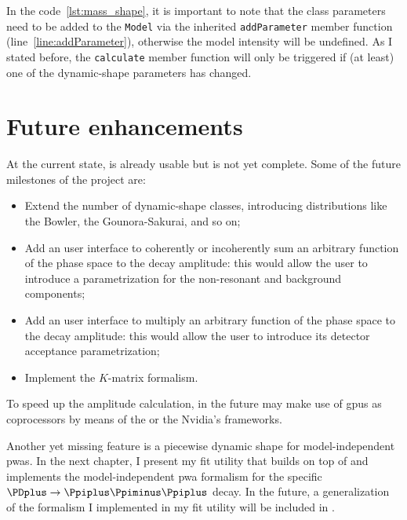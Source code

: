     
    In the code~\ref{lst:mass_shape}, it is important to note that the class parameters need to be added to the \lstinline!Model! via the inherited \lstinline!addParameter! member function (line~\ref{line:addParameter}), otherwise the model intensity will be undefined.
    As I stated before, the \lstinline!calculate! member function will only be triggered if (at least) one of the dynamic-shape parameters has changed.


    \section{Future enhancements}

    At the current state,  is already usable but is not yet complete.
    Some of the future milestones of the project are:
    \begin{itemize}
        \item
            Extend the number of dynamic-shape classes, introducing distributions like the Bowler, the Gounora-Sakurai, and so on;

        \item
            Add an user interface to coherently or incoherently sum an arbitrary function of the phase space to the decay amplitude: this would allow the user to introduce a parametrization for the non-resonant and background components;

        \item
            Add an user interface to multiply an arbitrary function of the phase space to the decay amplitude: this would allow the user to introduce its detector acceptance parametrization;

        \item
            Implement the $K$-matrix formalism.

    \end{itemize}

    To speed up the amplitude calculation, in the future  may make use of \acsp{gpu} as coprocessors by means of the  or the Nvidia's  frameworks.


    Another yet missing feature is a piecewise dynamic shape for model-independent \acp{pwa}.
    In the next chapter, I present my fit utility that builds on top of  and implements the model-independent \ac{pwa} formalism for the specific $\PDplus\to\Ppiplus\Ppiminus\Ppiplus$ decay.
    In the future, a generalization of the formalism I implemented in my fit utility will be included in .
